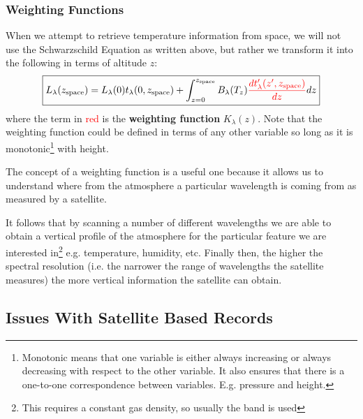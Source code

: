 \subsubsection{Weighting Functions}
\label{sec:weighting_functions}

When we attempt to retrieve temperature information from space, we will not use
the Schwarzschild Equation as written above, but rather we transform it into the
following in terms of altitude $z$:
$$
\boxed{
    L_\lambda(z_{\text{space}}) = L_\lambda(0) t_\lambda(0, z_{\text{space}}) +
    \int_{z=0}^{z_{\text{space}}} B_\lambda(T_z) \textcolor{red}{
    \frac{dt_\lambda' (z', z_{\text{space}})}{dz}} dz
}
$$
where the term in \textcolor{red}{red} is the \textbf{weighting function} 
$K_\lambda(z)$. Note that the weighting function could be defined in terms of 
any other variable so long as it is monotonic\footnote{Monotonic means that one
variable is either always increasing or always decreasing with respect to the
other variable. It also ensures that there is a one-to-one correspondence between 
variables. E.g. pressure and height.} with height.

The concept of a weighting function is a useful one because it allows us to
understand where from the atmosphere a particular wavelength is coming from as
measured by a satellite.

It follows that by scanning a number of different wavelengths we are able to 
obtain a vertical profile of the atmosphere for the particular feature we are 
interested in\footnote{This requires a constant gas density, so usually the 
band is used} e.g. temperature, humidity, etc. Finally then, the higher the 
spectral resolution (i.e. the narrower the range of wavelengths the satellite
measures) the more vertical information the satellite can obtain.

\subsection{Issues With Satellite Based Records}
\label{sec:issues_satellite}

